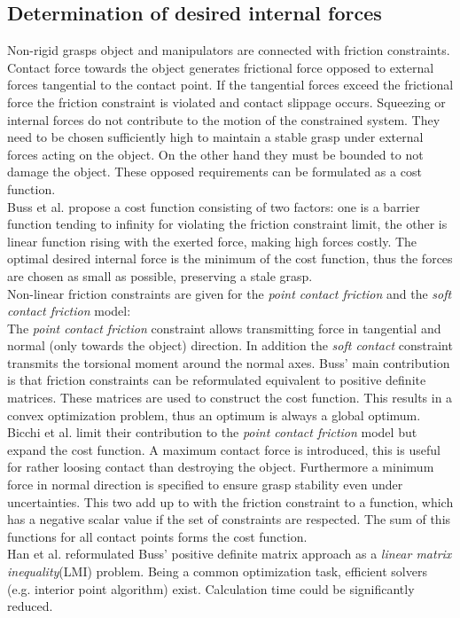 \documentclass[a4paper,twoside, openright,12pt]{report}
\begin{document}
\subsection{Determination of desired internal forces}
Non-rigid grasps object and manipulators are connected with friction constraints. Contact force towards the object generates frictional force opposed to external forces tangential to the contact point. If the tangential forces exceed the frictional force the friction constraint is violated and contact slippage occurs. Squeezing or internal forces do not contribute to the motion of the constrained system. They need to be chosen sufficiently high to maintain a stable grasp under external forces acting on the object. On the other hand they must be bounded to not damage the object. These opposed requirements can be formulated as a cost function.\\
Buss et al. \cite{Buss_96} propose a cost function consisting of two factors: one is a barrier function tending to infinity for violating the friction constraint limit, the other is linear function rising with the exerted force, making high forces costly. The optimal desired internal force is the minimum of the cost function, thus the forces are chosen as small as possible, preserving a stale grasp.\\
Non-linear friction constraints are given for the \textit{point contact friction} and the \textit{soft contact friction} model:\\
The \textit{point contact friction} constraint allows transmitting force in tangential  and normal  (only towards the object) direction. In addition the \textit{soft contact} constraint transmits the torsional moment around the normal axes. Buss' main contribution is that friction constraints can be reformulated  equivalent to positive definite matrices. These matrices are used to construct the cost function. This results in a convex optimization problem, thus an optimum is always a global optimum. \\
Bicchi et al. \cite{Bicchi_98} limit their contribution to the \textit{point contact friction} model but expand the cost function. A maximum contact force is introduced, this is useful for rather loosing contact than destroying the object. Furthermore a minimum force in normal direction is specified to ensure grasp stability even under uncertainties. This two add up to with the friction constraint to a function, which has a negative scalar value if the set of constraints are respected. The sum of this functions for all contact points forms the cost function.\\ 
Han et al. \cite{Han_2000} reformulated Buss' positive definite matrix approach as a \textit{linear matrix inequality}(LMI) problem. Being a common optimization task, efficient solvers (e.g. interior point algorithm) exist. Calculation time could be significantly reduced.
\end{document}
